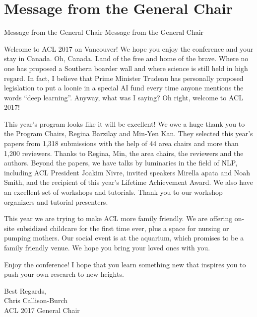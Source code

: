 \section{Message from the General Chair}\vspace{2em}
\setheaders%
    {Message from the General Chair}%
    {Message from the General Chair}
\thispagestyle{emptyheader}

\setlength{\parskip}{1ex}

Welcome to ACL 2017 on Vancouver!  We hope you enjoy the conference and your
stay in Canada. Oh, Canada. Land of the free and home of the brave. Where no
one has proposed a Southern boarder wall and where science is still held in
high regard.  In fact, I believe that Prime Minister Trudeau has personally
proposed legislation to put a loonie in a special AI fund every time anyone
mentions the words ``deep learning''.  Anyway, what was I saying? Oh right,
welcome to ACL 2017!  

This year's program looks like it will be excellent!  We owe a huge thank you
to the Program Chairs, Regina Barzilay and Min-Yen Kan.  They selected this
year's papers from 1,318 submissions with the help of 44 area chairs and more
than 1,200 reviewers. Thanks to Regina, Min, the area chairs, the reviewers
and the authors. Beyond the papers, we have talks by luminaries in the field
of NLP, including ACL President Joakim Nivre, invited speakers Mirella 
apata and Noah Smith, and the recipient of this year's Lifetime Achievement
Award.  We also have an excellent set of workshops and tutorials. Thank you to
our workshop organizers and tutorial presenters. 

This year we are trying to make ACL more family friendly. We are offering
on-site subsidized childcare for the first time ever, plus a space for nursing
or pumping mothers. Our social event is at the aquarium, which promises to be
a family friendly venue. We hope you bring your loved ones with you.  

Enjoy the conference! I hope that you learn something new that inspires you to
push your own research to new heights.  

\vskip 0.5in
\noindent Best Regards,\\
Chris Callison-Burch\\
ACL 2017 General Chair

